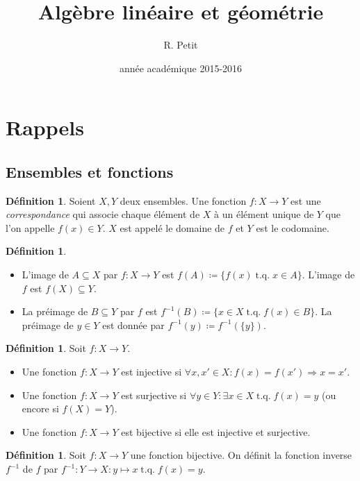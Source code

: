 \documentclass{article}
\title{Algèbre linéaire et géométrie}
\author{R. Petit}
\date{année académique 2015-2016}
\DeclareMathOperator{\tq}{\text{ t.q. }}
\theoremstyle{definition}
\newtheorem{déf}[thm]{Définition}
\theoremstyle{remark}
\begin{document}
\maketitle
\tableofcontents
\newpage
{}

\section{Rappels}
	\subsection{Ensembles et fonctions}
		\begin{déf} Soient $X, Y$ deux ensembles. Une fonction $f : X \to Y$ est une \textit{correspondance} qui associe chaque élément de $X$ à un élément unique de $Y$
		que l'on appelle $f(x) \in Y$. $X$ est appelé le domaine de $f$ et $Y$ est le codomaine. \end{déf}

		\begin{déf}~
		\begin{itemize}
			\item L'image de $A \subseteq X$ par $f : X \to Y$ est $f(A) \coloneqq \{f(x) \tq x \in A\}$. L'image de $f$ est $f(X) \subseteq Y$.
			\item La préimage de $B \subseteq Y$ par $f$ est $f^{-1}(B) \coloneqq \{x \in X \tq f(x) \in B\}$. La préimage de $y \in Y$ est donnée par
			      $f^{-1}(y) \coloneqq f^{-1}(\{y\})$.
		\end{itemize}
		\end{déf}

		\begin{déf} Soit $f : X \to Y$.
		\begin{itemize}
			\item Une fonction $f : X \to Y$ est injective si $\forall x, x' \in X : f(x) = f(x') \Rightarrow x = x'$.
			\item Une fonction $f : X \to Y$ est surjective si $\forall y \in Y : \exists x \in X \tq f(x) = y$ (ou encore si $f(X) = Y$).
			\item Une fonction $f : X \to Y$ est bijective si elle est injective et surjective.
		\end{itemize}
		\end{déf}

		\begin{déf} Soit $f : X \to Y$ une fonction bijective. On définit la fonction inverse $f^{-1}$ de $f$ par $f^{-1} : Y \to X : y \mapsto x \tq f(x) = y$. \end{déf}
		
\end{document}
